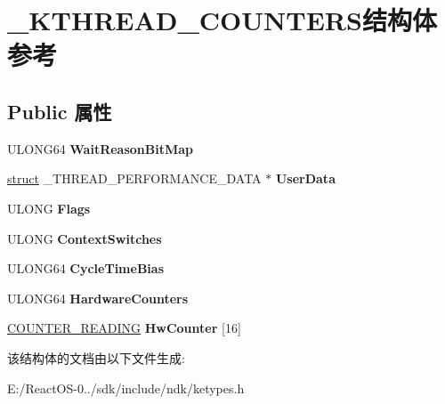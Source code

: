 \hypertarget{struct___k_t_h_r_e_a_d___c_o_u_n_t_e_r_s}{}\section{\+\_\+\+K\+T\+H\+R\+E\+A\+D\+\_\+\+C\+O\+U\+N\+T\+E\+R\+S结构体 参考}
\label{struct___k_t_h_r_e_a_d___c_o_u_n_t_e_r_s}
\subsection*{Public 属性}
\begin{DoxyCompactItemize}
\item 
\mbox{\label{struct___k_t_h_r_e_a_d___c_o_u_n_t_e_r_s_a1e2621c86d9bc1d82bf5de6ddf525475}} 
U\+L\+O\+N\+G64 {\bfseries Wait\+Reason\+Bit\+Map}
\item 
\mbox{\label{struct___k_t_h_r_e_a_d___c_o_u_n_t_e_r_s_a7a041b177a0daec96a430ed15a6871b6}} 
\hyperlink{interfacestruct}{struct} \+\_\+\+T\+H\+R\+E\+A\+D\+\_\+\+P\+E\+R\+F\+O\+R\+M\+A\+N\+C\+E\+\_\+\+D\+A\+TA $\ast$ {\bfseries User\+Data}
\item 
\mbox{\label{struct___k_t_h_r_e_a_d___c_o_u_n_t_e_r_s_a95818ef7f09a0b18e397af93d2922e12}} 
U\+L\+O\+NG {\bfseries Flags}
\item 
\mbox{\label{struct___k_t_h_r_e_a_d___c_o_u_n_t_e_r_s_af18ed3a2e29031b3ca4487d62bef8684}} 
U\+L\+O\+NG {\bfseries Context\+Switches}
\item 
\mbox{\label{struct___k_t_h_r_e_a_d___c_o_u_n_t_e_r_s_a1cdfc4b2abdd868ec60115be60b846db}} 
U\+L\+O\+N\+G64 {\bfseries Cycle\+Time\+Bias}
\item 
\mbox{\label{struct___k_t_h_r_e_a_d___c_o_u_n_t_e_r_s_a51721f34af95e1ba88e33a3668a30ff4}} 
U\+L\+O\+N\+G64 {\bfseries Hardware\+Counters}
\item 
\mbox{\label{struct___k_t_h_r_e_a_d___c_o_u_n_t_e_r_s_ac5d8c48b0d4ab758738d757c6949b3db}} 
\hyperlink{struct___c_o_u_n_t_e_r___r_e_a_d_i_n_g}{C\+O\+U\+N\+T\+E\+R\+\_\+\+R\+E\+A\+D\+I\+NG} {\bfseries Hw\+Counter} \mbox{[}16\mbox{]}
\end{DoxyCompactItemize}


该结构体的文档由以下文件生成\+:\begin{DoxyCompactItemize}
\item 
E\+:/\+React\+O\+S-\/0../sdk/include/ndk/ketypes.\+h\end{DoxyCompactItemize}

